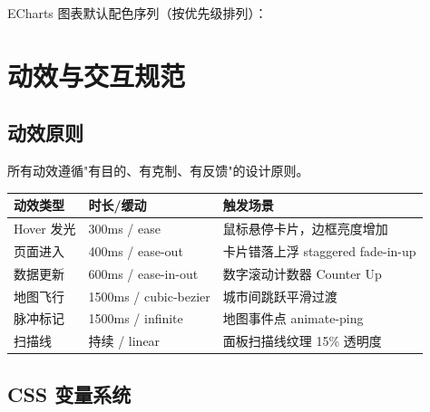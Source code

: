 \begin{specbox}[图表配色序列]
ECharts 图表默认配色序列（按优先级排列）：\\[4pt]
\end{specbox}

\newpage
\section{动效与交互规范}

\subsection{动效原则}

 所有动效遵循"有目的、有克制、有反馈"的设计原则。

\begin{center}
\renewcommand{\arraystretch}{1.6}
\begin{tabularx}{\textwidth}{>{\centering\arraybackslash\heiti}p{3cm} >{\centering\arraybackslash}p{3cm} X}
\toprule
\textbf{动效类型} & \textbf{时长/缓动} & \textbf{触发场景} \\
\midrule
Hover 发光 & 300ms / ease & 鼠标悬停卡片，边框亮度增加 \\
页面进入 & 400ms / ease-out & 卡片错落上浮 staggered fade-in-up \\
数据更新 & 600ms / ease-in-out & 数字滚动计数器 Counter Up \\
地图飞行 & 1500ms / cubic-bezier & 城市间跳跃平滑过渡 \\
脉冲标记 & 1500ms / infinite & 地图事件点 animate-ping \\
扫描线 & 持续 / linear & 面板扫描线纹理 15\% 透明度 \\
\bottomrule
\end{tabularx}
\end{center}

\subsection{CSS 变量系统}

